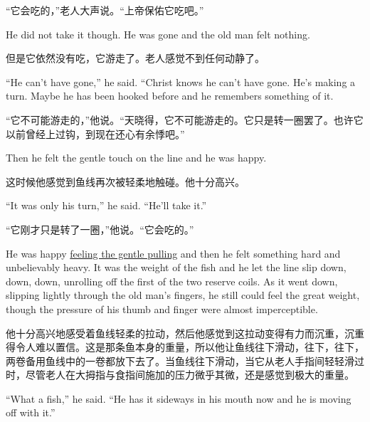 \begin{paracol}{2}
\switchcolumn

“它会吃的，”老人大声说。“上帝保佑它吃吧。”

\switchcolumn*

He did not take it though. He was gone and the old man felt nothing.

\switchcolumn

但是它依然没有吃，它游走了。老人感觉不到任何动静了。

\switchcolumn*

``He can't have gone,'' he said. ``\gls{Christ} knows he can't have gone. He's
making a turn. Maybe he has been hooked before and he remembers something of
it.

\switchcolumn

“它不可能游走的，”他说。“天晓得，它不可能游走的。它只是转一圈罢了。也许它以前曾经上过钩，到现在还心有余悸吧。”

\switchcolumn*

Then he felt the \gls{gentle} touch on the line and he was happy.

\switchcolumn

这时候他感觉到鱼线再次被轻柔地触碰。他十分高兴。

\switchcolumn*

``It was only his turn,'' he said. ``He'll take it.''

\switchcolumn

“它刚才只是转了一圈，”他说。“它会吃的。”

\switchcolumn*

He was happy \uline{feeling the gentle pulling} and then he felt something hard
and unbelievably heavy. It was the weight of the fish and he let the line
\gls{slip} down, down, down, \gls{unrolling} off the first of the two
\gls{reserve} coils. As it went down, slipping lightly through the old man's
fingers, he still could feel the great weight, though the \gls{pressure} of
his thumb and finger were almost \gls{imperceptible}.

\switchcolumn

他十分高兴地感受着鱼线轻柔的拉动，然后他感觉到这拉动变得有力而沉重，沉重得令人难以置信。这是那条鱼本身的重量，所以他让鱼线往下滑动，往下，往下，两卷备用鱼线中的一卷都放下去了。当鱼线往下滑动，当它从老人手指间轻轻滑过时，尽管老人在大拇指与食指间施加的压力微乎其微，还是感觉到极大的重量。

\switchcolumn*

``What a fish,'' he said. ``He has it \gls{sideways} in his mouth now and he is moving off with it.''


\end{paracol}
